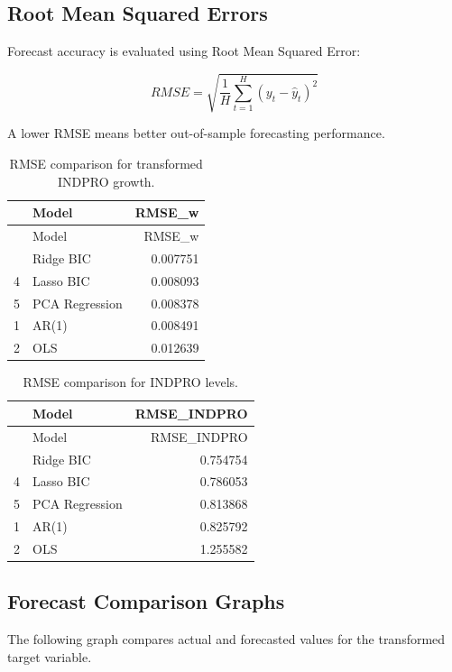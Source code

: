 \documentclass[
  letterpaper,
  DIV=11,
  numbers=noendperiod]{scrartcl}
\begin{document}
\subsection{Root Mean Squared Errors}\label{root-mean-squared-errors}

Forecast accuracy is evaluated using Root Mean Squared Error:

\[
RMSE = \sqrt{\frac{1}{H}\sum_{t=1}^{H}(y_t - \hat{y}_t)^2}
\]

A lower RMSE means better out-of-sample forecasting performance.

\begin{longtable}[]{@{}llr@{}}
\caption{RMSE comparison for transformed INDPRO growth.}\tabularnewline
\toprule\noalign{}
& Model & RMSE\_w \\
\midrule\noalign{}
\endfirsthead
\toprule\noalign{}
& Model & RMSE\_w \\
\midrule\noalign{}
\endhead
\bottomrule\noalign{}
\endlastfoot
3 & Ridge BIC & 0.007751 \\
4 & Lasso BIC & 0.008093 \\
5 & PCA Regression & 0.008378 \\
1 & AR(1) & 0.008491 \\
2 & OLS & 0.012639 \\
\end{longtable}

\begin{longtable}[]{@{}llr@{}}
\caption{RMSE comparison for INDPRO levels.}\tabularnewline
\toprule\noalign{}
& Model & RMSE\_INDPRO \\
\midrule\noalign{}
\endfirsthead
\toprule\noalign{}
& Model & RMSE\_INDPRO \\
\midrule\noalign{}
\endhead
\bottomrule\noalign{}
\endlastfoot
3 & Ridge BIC & 0.754754 \\
4 & Lasso BIC & 0.786053 \\
5 & PCA Regression & 0.813868 \\
1 & AR(1) & 0.825792 \\
2 & OLS & 1.255582 \\
\end{longtable}

\subsection{Forecast Comparison
Graphs}\label{forecast-comparison-graphs}

The following graph compares actual and forecasted values for the
transformed target variable.
\end{document}
